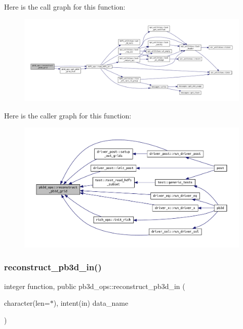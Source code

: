 Here is the call graph for this function\+:\nopagebreak
\begin{figure}[H]
\begin{center}
\leavevmode
\includegraphics[width=350pt]{namespacepb3d__ops_a4218b582c5029ff05893265fa329877b_cgraph}
\end{center}
\end{figure}
Here is the caller graph for this function\+:\nopagebreak
\begin{figure}[H]
\begin{center}
\leavevmode
\includegraphics[width=350pt]{namespacepb3d__ops_a4218b582c5029ff05893265fa329877b_icgraph}
\end{center}
\end{figure}
\mbox{\label{namespacepb3d__ops_ad1481747b9b9832f816d4bf1dd2d6737}} 
\subsubsection{\texorpdfstring{reconstruct\+\_\+pb3d\+\_\+in()}{reconstruct\_pb3d\_in()}}
{\footnotesize\ttfamily integer function, public pb3d\+\_\+ops\+::reconstruct\+\_\+pb3d\+\_\+in (\begin{DoxyParamCaption}\item[{character(len=$\ast$), intent(in)}]{data\+\_\+name }\end{DoxyParamCaption})}



